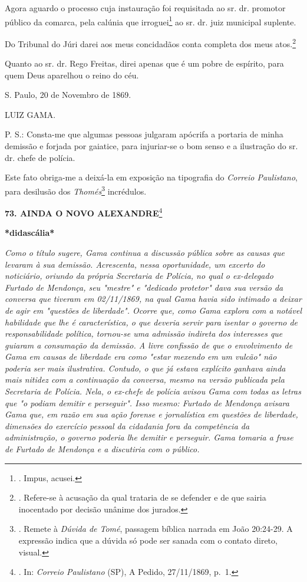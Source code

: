 Agora aguardo o processo cuja instauração foi requisitada ao sr. dr.
promotor público da comarca, pela calúnia que irroguei\footnote{. Impus,
  acusei.} ao sr. dr. juiz municipal suplente.

Do Tribunal do Júri darei aos meus concidadãos conta completa dos meus
atos.\footnote{. Refere-se à acusação da qual trataria de se defender e
  de que sairia inocentado por decisão unânime dos jurados.}

Quanto ao sr. dr. Rego Freitas, direi apenas que é um pobre de espírito,
para quem Deus aparelhou o reino do céu.

S. Paulo, 20 de Novembro de 1869.

LUIZ GAMA.

P. S.: Consta-me que algumas pessoas julgaram apócrifa a portaria de
minha demissão e forjada por gaiatice, para injuriar-se o bom senso e a
ilustração do sr. dr. chefe de polícia.

Este fato obriga-me a deixá-la em exposição na tipografia do
\emph{Correio Paulistano}, para desilusão dos \emph{Thomés}\footnote{.
  Remete à \emph{Dúvida de Tomé}, passagem bíblica narrada em João
  20:24-29. A expressão indica que a dúvida só pode ser sanada com o
  contato direto, visual.} incrédulos.

\textbf{73. AINDA O NOVO ALEXANDRE}\footnote{. In: \emph{Correio
  Paulistano} (SP), A Pedido, 27/11/1869, p.~1.}

\textbf{*didascália*}

\emph{Como o título sugere, Gama continua a discussão pública sobre as
causas que levaram à sua demissão. Acrescenta, nessa oportunidade, um
excerto do noticiário, oriundo da própria Secretaria de Polícia, no qual
o ex-delegado Furtado de Mendonça, seu "mestre" e "dedicado protetor"
dava sua versão da conversa que tiveram em 02/11/1869, na qual Gama
havia sido intimado a deixar de agir em "questões de liberdade". Ocorre
que, como Gama explora com a notável habilidade que lhe é
característica, o que deveria servir para isentar o governo de
responsabilidade política, tornou-se uma admissão indireta dos
interesses que guiaram a consumação da demissão. A livre confissão de
que o envolvimento de Gama em causas de liberdade era como "estar
mexendo em um vulcão" não poderia ser mais ilustrativa. Contudo, o que
já estava explícito ganhava ainda mais nitidez com a continuação da
conversa, mesmo na versão publicada pela Secretaria de Polícia. Nela, o
ex-chefe de polícia avisou Gama com todas as letras que "o podiam
demitir e perseguir". Isso mesmo: Furtado de Mendonça avisara Gama que,
em razão em sua ação forense e jornalística em questões de liberdade,
dimensões do exercício pessoal da cidadania fora da competência da
administração, o governo poderia lhe demitir e perseguir. Gama tomaria a
frase de Furtado de Mendonça e a discutiria com o público.}

